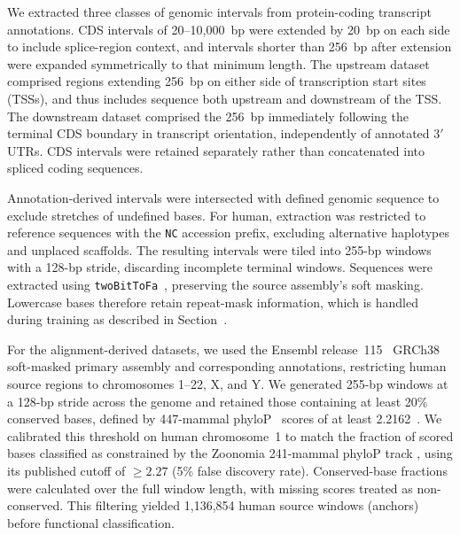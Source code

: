 \documentclass[a4paper,num-refs]{oup-contemporary}
\begin{document}
We extracted three classes of genomic intervals from protein-coding
transcript annotations.
CDS intervals of 20--10,000~bp were extended by 20~bp on each side to
include splice-region context, and intervals shorter than 256~bp after
extension were expanded symmetrically to that minimum length.
The upstream dataset comprised regions extending 256~bp on either side
of transcription start sites (TSSs), and thus includes sequence both
upstream and downstream of the TSS.
The downstream dataset comprised the 256~bp immediately following the
terminal CDS boundary in transcript orientation, independently of
annotated 3$'$ UTRs.
CDS intervals were retained separately rather than concatenated into
spliced coding sequences.

Annotation-derived intervals were intersected with defined genomic
sequence to exclude stretches of undefined bases.
For human, extraction was restricted to reference sequences with the
\texttt{NC} accession prefix, excluding alternative haplotypes and
unplaced scaffolds.
The resulting intervals were tiled into 255-bp windows with a 128-bp
stride, discarding incomplete terminal windows.
Sequences were extracted using \texttt{twoBitToFa}~\cite{kuhn2013ucsc},
preserving the
source assembly's soft masking. Lowercase bases therefore retain
repeat-mask information, which is
handled during training as described in
Section~.

For the alignment-derived datasets, we used the Ensembl
release~115~\cite{yates2026ensembl}
GRCh38 soft-masked primary assembly and corresponding annotations,
restricting human source regions to chromosomes 1--22, X, and Y.
We generated 255-bp windows at a 128-bp stride across the genome and
retained those containing at least 20\% conserved bases, defined by
447-mammal phyloP~\citep{pollard2010phylop} scores of at least
2.2162~\citep{phylop447resource,kuderna2024identification}.
We calibrated this threshold on human chromosome~1 to match the fraction
of scored bases classified as constrained by the Zoonomia 241-mammal
phyloP track \citep{sullivan2023leveraging}, using its published cutoff of $\geq 2.27$
(5\% false discovery rate).
Conserved-base fractions were calculated over the full window length,
with missing scores treated as non-conserved.
This filtering yielded 1,136,854 human source windows (anchors) before
functional classification.
\end{document}
